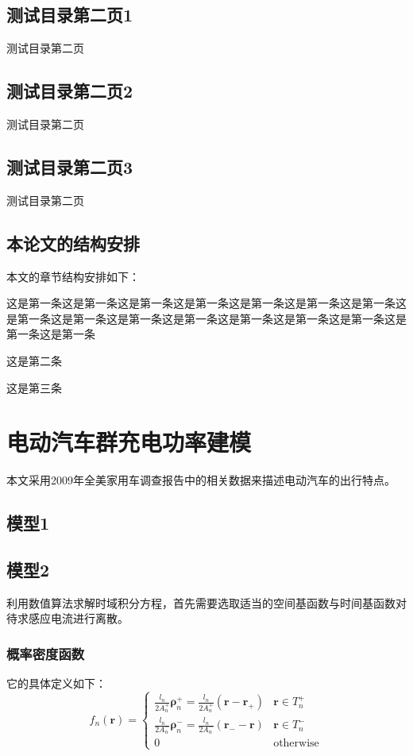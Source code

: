 \documentclass[bachelor]{NCEPU-thesis}
\begin{document}
\section{测试目录第二页1}
测试目录第二页

\section{测试目录第二页2}
测试目录第二页

\section{测试目录第二页3}
测试目录第二页

\section{本论文的结构安排}
本文的章节结构安排如下：

 这是第一条这是第一条这是第一条这是第一条这是第一条这是第一条这是第一条这是第一条这是第一条这是第一条这是第一条这是第一条这是第一条这是第一条这是第一条这是第一条

 这是第二条

 这是第三条

\chapter{电动汽车群充电功率建模}
本文采用2009年全美家用车调查报告中的相关数据来描述电动汽车的出行特点。

\section{模型1}

\section{模型2}
利用数值算法求解时域积分方程，首先需要选取适当的空间基函数与时间基函数对待求感应电流进行离散。

\subsection{概率密度函数}
它的具体定义如下：
\begin{equation}
f_n(\bm{r})=
\begin{cases}
\frac{l_n}{2A_n^+}\bm{\rho}_n^+=\frac{l_n}{2A_n^+}(\bm{r}-\bm{r}_+)&\bm{r}\in T_n^+\\
\frac{l_n}{2A_n^-}\bm{\rho}_n^-=\frac{l_n}{2A_n^-}(\bm{r}_--\bm{r})&\bm{r}\in T_n^-\\
0&\text{otherwise}
\end{cases}
\end{equation}
\end{document}

